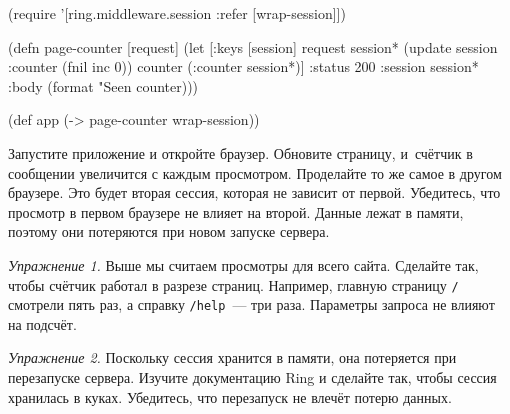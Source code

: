 
\ifnarrow

\begin{english}
  \begin{clojure}
(require '[ring.middleware.session
           :refer [wrap-session]])

(defn page-counter [request]
  (let [{:keys [session]} request
        session* (update session
                   :counter (fnil inc 0))
        counter (:counter session*)]
    {:status 200
     :session session*
     :body (format "Seen %
                   counter)}))

(def app (-> page-counter
             wrap-session))
  \end{clojure}
\end{english}

\else

\begin{english}
\end{english}

\fi

Запустите приложение и откройте браузер. Обновите страницу, и~счётчик в
сообщении увеличится с каждым просмотром. Проделайте то же самое в другом
браузере. Это будет вторая сессия, которая не зависит от первой. Убедитесь, что
просмотр в первом браузере не влияет на второй. Данные лежат в памяти, поэтому
они потеряются при новом запуске сервера.

\emph{Упражнение 1.} Выше мы считаем просмотры для всего сайта. Сделайте так,
чтобы счётчик работал в разрезе страниц. Например, главную страницу \verb|/|
смотрели пять раз, а справку \verb|/help|~--- три раза. Параметры запроса не
влияют на подсчёт.

\emph{Упражнение 2.} Поскольку сессия хранится в памяти, она потеряется при
перезапуске сервера. Изучите документацию Ring и сделайте так, чтобы сессия
хранилась в куках. Убедитесь, что перезапуск не влечёт потерю данных.

